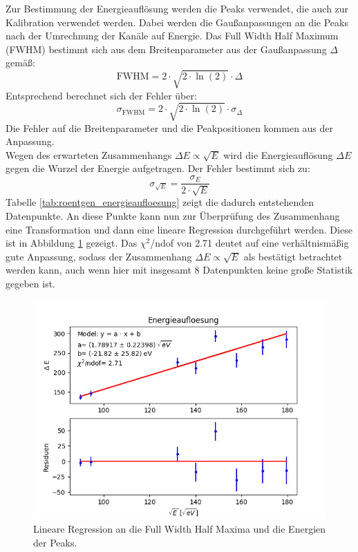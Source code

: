\documentclass[12pt,a4paper]{article}
\begin{document}
Zur Bestimmung der Energieauflösung werden die Peaks verwendet, die auch zur Kalibration verwendet werden. Dabei werden die Gaußanpassungen an die Peaks nach der Umrechnung der Kanäle auf Energie. Das Full Width Half Maximum (FWHM) bestimmt sich aus dem Breitenparameter aus der Gaußanpassung $\Delta$ gemäß:
\begin{equation*}
\textrm{FWHM} = 2 \cdot \sqrt{2 \cdot \ln(2)} \cdot \Delta
\end{equation*}
Entsprechend berechnet sich der Fehler über:
\begin{equation*}
\sigma _\textrm{FWHM} = 2 \cdot \sqrt{2 \cdot \ln(2)} \cdot \sigma _\Delta
\end{equation*}
Die Fehler auf die Breitenparameter und die Peakpositionen kommen aus der Anpassung. \\
Wegen des erwarteten Zusammenhangs $\Delta E \propto \sqrt{E}$ wird die Energieauflösung $\Delta E$ gegen die Wurzel der Energie aufgetragen. Der Fehler bestimmt sich zu:
\begin{equation*}
\sigma _{\sqrt{E}} = \dfrac{\sigma _E}{2 \cdot \sqrt{E}}
\end{equation*}
Tabelle \ref{tab:roentgen_energieaufloesung} zeigt die dadurch entstehenden Datenpunkte. An diese Punkte kann nun zur Überprüfung des Zusammenhang eine Transformation und dann eine lineare Regression durchgeführt werden. Diese ist in Abbildung \ref{fig:roentgen_energieaufloesung} gezeigt. Das $\chi ^2$/ndof von 2.71 deutet auf eine verhältnismäßig gute Anpassung, sodass der Zusammenhang $\Delta E \propto \sqrt{E}$ als bestätigt betrachtet werden kann, auch wenn hier mit insgesamt 8 Datenpunkten keine große Statistik gegeben ist.

\begin{figure}
\centering
\includegraphics[scale=0.8]{Bilder/Energieaufloesung/roentgen_gesamt.png}
\caption{Lineare Regression an die Full Width Half Maxima und die Energien der Peaks.}
\label{fig:roentgen_energieaufloesung}
\end{figure}
\end{document}
